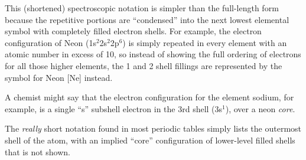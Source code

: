 












This (shortened) spectroscopic notation is simpler than the full-length form because the repetitive portions are ``condensed'' into the next lowest elemental symbol with completely filled electron shells.  For example, the electron configuration of Neon (1s$^{2}$2s$^{2}$2p$^{6}$) is simply repeated in every element with an atomic number in excess of 10, so instead of showing the full ordering of electrons for all those higher elements, the 1 and 2 shell fillings are represented by the symbol for Neon [Ne] instead.

\vskip 10pt

A chemist might say that the electron configuration for the element sodium, for example, is a single ``s'' subshell electron in the 3rd shell (3s$^{1}$), over a neon {\it core}.

The {\it really} short notation found in most periodic tables simply lists the outermost shell of the atom, with an implied ``core'' configuration of lower-level filled shells that is not shown.




